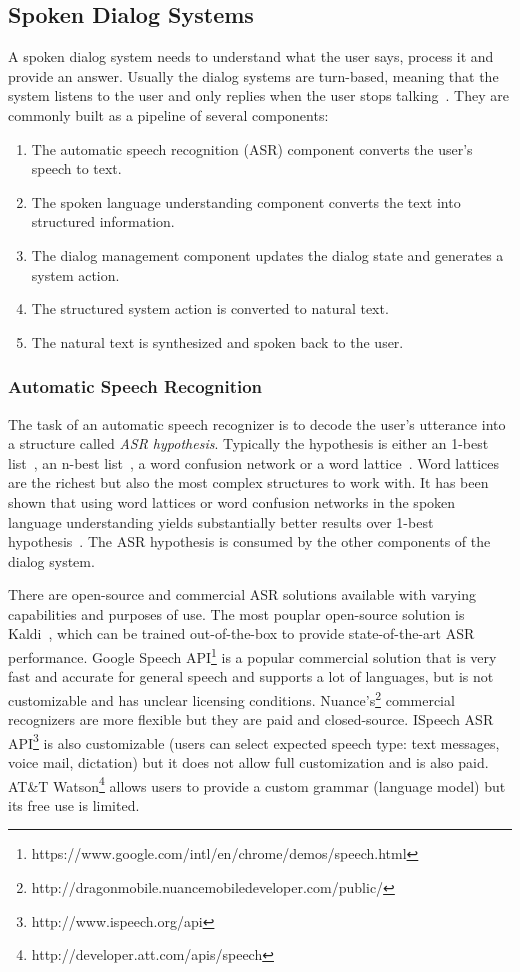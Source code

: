 \documentclass[runningheads,a4paper]{llncs}
\begin{document}
\subsection{Spoken Dialog Systems}
\label{sec:spoken_dialog_systems}
A spoken dialog system needs to understand what the user says, process it and provide an answer. Usually the dialog systems are turn-based, meaning that the system listens to the user and only replies when the user stops talking~\cite{thomson2010bayesian}. They are commonly built as a pipeline of several components:
\begin{enumerate}
  \item The automatic speech recognition (ASR) component converts the user's speech to text.
  \item The spoken language understanding component converts the text into structured information.
  \item The dialog management component updates the dialog state and generates a system action.
  \item The structured system action is converted to natural text.
  \item The natural text is synthesized and spoken back to the user.
\end{enumerate}

\subsubsection{Automatic Speech Recognition}
The task of an automatic speech recognizer is to decode the user's utterance into a structure called \emph{ASR hypothesis}. Typically the hypothesis is either an 1-best list~\cite{gorin1997may,wang2003word}, an n-best list~\cite{he2003data}, a word confusion network\cite{hakkani2006beyond} or a word lattice~\cite{oerder1993word}. Word lattices are the richest but also the most complex structures to work with. It has been shown that using word lattices or word confusion networks in the spoken language understanding yields substantially better results over 1-best hypothesis~\cite{tur2002improving}. The ASR hypothesis is consumed by the other components of the dialog system.

There are open-source and commercial ASR solutions available with varying capabilities and purposes of use. The most pouplar open-source solution is Kaldi~\cite{povey2011kaldi}, which can be trained out-of-the-box to provide state-of-the-art ASR performance. Google Speech API\footnote{https://www.google.com/intl/en/chrome/demos/speech.html} is a popular commercial solution that is very fast and accurate for general speech and supports a lot of languages, but is not customizable and has unclear licensing conditions. Nuance's\footnote{http://dragonmobile.nuancemobiledeveloper.com/public/} commercial recognizers are more flexible but they are paid and closed-source. ISpeech ASR API\footnote{http://www.ispeech.org/api} is also customizable (users can select expected speech type: text messages, voice mail, dictation) but it does not allow full customization and is also paid. AT\&T Watson\footnote{http://developer.att.com/apis/speech} allows users to provide a custom grammar (language model) but
its free use is limited.
\end{document}
